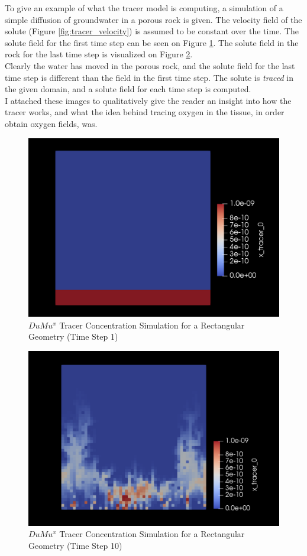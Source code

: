 To give an example of what the tracer model is computing, a simulation of a simple diffusion of groundwater in a porous rock is given. The velocity field of the solute (Figure \ref{fig:tracer_velocity}) is assumed to be constant over the time. The solute field for the first time step can be seen on Figure \ref{fig:tracer_1}. The solute field in the rock for the last time step is visualized on Figure \ref{fig:tracer_2}.\\
Clearly the water has moved in the porous rock, and the solute field for the last time step is different than the field in the first time step. The solute is \emph{traced} in the given domain, and a solute field for each time step is computed.\\
I attached these images to qualitatively give the reader an insight into how the tracer works, and what the idea behind tracing oxygen in the tissue, in order obtain oxygen fields, was.
\begin{figure}[h]
\centering
\includegraphics[width=162mm]{tracer_1}
\caption{\footnotesize $DuMu^x$ Tracer Concentration Simulation for a Rectangular Geometry (Time Step 1)}
\label{fig:tracer_1}
\end{figure}
\begin{figure}[h]
\centering
\includegraphics[width=162mm]{tracer_2}
\caption{\footnotesize $DuMu^x$ Tracer Concentration Simulation for a Rectangular Geometry (Time Step 10)}
\label{fig:tracer_2}
\end{figure}
